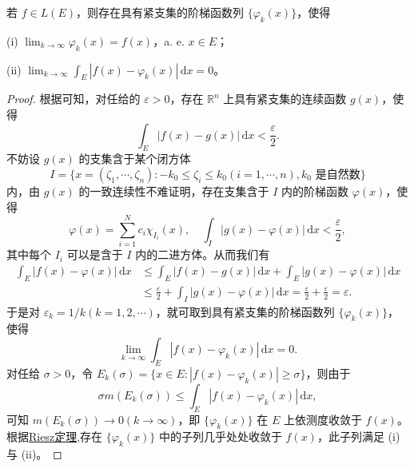 \documentclass[../../main.tex]{subfiles}
\begin{document}
\begin{corollary}\label{corollary:推论4.22}
若 \( f \in L(E) \)，则存在具有紧支集的阶梯函数列 \( \{\varphi_k(x)\} \)，使得

(i) \( \lim_{k \to \infty} \varphi_k(x) = f(x) \)，a. e. \( x \in E \)；

(ii) \( \lim_{k \to \infty} \int_E |f(x) - \varphi_k(x)| \, \mathrm{d}x = 0 \)。
\end{corollary}
\begin{proof}
根据可知，对任给的 \( \varepsilon > 0 \)，存在 \( \mathbb{R}^n \) 上具有紧支集的连续函数 \( g(x) \)，使得
\[
\int_E |f(x) - g(x)| \, \mathrm{d}x < \frac{\varepsilon}{2}.
\]
不妨设 \( g(x) \) 的支集含于某个闭方体
\[
I = \{ x = (\zeta_1, \cdots, \zeta_n) : -k_0 \leqslant \zeta_i \leqslant k_0 (i = 1, \cdots, n), k_0 \text{ 是自然数} \}
\]
内，由 \( g(x) \) 的一致连续性不难证明，存在支集含于 \( I \) 内的阶梯函数 \( \varphi(x) \)，使得
\[
\varphi(x) = \sum_{i=1}^N c_i \chi_{I_i}(x), \quad \int_I |g(x) - \varphi(x)| \, \mathrm{d}x < \frac{\varepsilon}{2},
\]
其中每个 \( I_i \) 可以是含于 \( I \) 内的二进方体。从而我们有
\begin{align*}
\int_E |f(x) - \varphi(x)| \, \mathrm{d}x &\leqslant \int_E |f(x) - g(x)| \, \mathrm{d}x + \int_E |g(x) - \varphi(x)| \, \mathrm{d}x \\
&\leqslant \frac{\varepsilon}{2} + \int_I |g(x) - \varphi(x)| \, \mathrm{d}x = \frac{\varepsilon}{2} + \frac{\varepsilon}{2} = \varepsilon.
\end{align*}
于是对 \( \varepsilon_k = 1/k (k = 1, 2, \cdots) \)，就可取到具有紧支集的阶梯函数列 \( \{\varphi_k(x)\} \)，使得
\[
\lim_{k \to \infty} \int_E |f(x) - \varphi_k(x)| \, \mathrm{d}x = 0.
\]
对任给 \( \sigma > 0 \)，令 \( E_k(\sigma) = \{ x \in E : |f(x) - \varphi_k(x)| \geqslant \sigma \} \)，则由于
\[
\sigma m(E_k(\sigma)) \leqslant \int_E |f(x) - \varphi_k(x)| \, \mathrm{d}x,
\]
可知 \( m(E_k(\sigma)) \to 0 (k \to \infty) \)，即 \( \{\varphi_k(x)\} \) 在 \( E \) 上依测度收敛于 \( f(x) \)。
根据\hyperref[theorem:Riesz定理]{Riesz定理},存在 \( \{\varphi_k(x)\} \) 中的子列几乎处处收敛于 \( f(x) \)，此子列满足 (i) 与 (ii)。
\end{proof}
\end{document}
